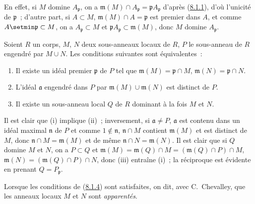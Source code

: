 En effet, si $M$ domine $A_\mathfrak p$, on a
$\mathfrak m(M)\cap A_\mathfrak p=\mathfrak p A_\mathfrak p$ d'après
(\hyperref[I.8.1.1-fr]{8.1.1}), d'où l'unicité de $\mathfrak p$~; d'autre
part, si $A\subset M$, $\mathfrak m(M)\cap A=\mathfrak p$ est premier dans
$A$, et comme $A\setmin\mathfrak p\subset M$, on a $A_\mathfrak p\subset M$ et
$\mathfrak p A_\mathfrak p\subset\mathfrak m(M)$, donc $M$ domine
$A_\mathfrak p$.

\begin{lemma}[8.1.4]
\label{I.8.1.4-fr}
Soient $R$ un corps, $M$, $N$ deux sous-anneaux locaux de $R$, $P$ le
sous-anneau de $R$ engendré par $M\cup N$. Les conditions suivantes sont
équivalentes~:
\begin{enumerate}
  \item[\textup{(i)}] Il existe un idéal premier $\mathfrak p$ de $P$ tel que
    $\mathfrak m(M)=\mathfrak p\cap M$,
    $\mathfrak m(N)=\mathfrak p\cap N$.
  \item[\textup{(ii)}] L'idéal $\mathfrak a$ engendré dans $P$ par
    $\mathfrak m(M)\cup\mathfrak m(N)$ est distinct de $P$.
  \item[\textup{(iii)}] Il existe un sous-anneau local $Q$ de $R$ dominant à la fois
    $M$ et $N$.
\end{enumerate}
\end{lemma}

Il est clair que (i) implique (ii)~; inversement, si $\mathfrak a\ne P$,
$\mathfrak a$ est contenu dans un idéal maximal $\mathfrak n$ de $P$ et comme
$1\notin\mathfrak n$, $\mathfrak n\cap M$ contient $\mathfrak m(M)$ et est
distinct de $M$, donc $\mathfrak n\cap M=\mathfrak m(M)$ et de même
$\mathfrak n\cap N=\mathfrak m(N)$. Il est clair que si $Q$ domine $M$ et
$N$, on a $P\subset Q$ et
$\mathfrak m(M)=\mathfrak m(Q)\cap M=(\mathfrak m(Q)\cap P)\cap M$,
$\mathfrak m(N)=(\mathfrak m(Q)\cap P)\cap N$,
donc (iii) entraîne (i)~; la réciproque est évidente en prenant
$Q=P_\mathfrak p$.

Lorsque les conditions de (\hyperref[I.8.1.4-fr]{8.1.4}) sont satisfaites,
on dit, avec C.~Chevalley, que les anneaux locaux $M$ et $N$ sont
\emph{apparentés}.


